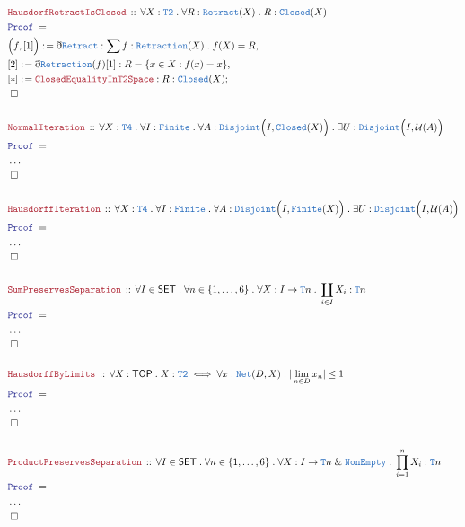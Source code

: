 \documentclass[12pt]{scrartcl}
\newcommand{\TYPE}[1]{\textcolor{NavyBlue}{\mathtt{#1}}}
\newcommand{\LOGIC}[1]{\textcolor{Blue}{\mathtt{#1}}}
\newcommand{\THM}[1]{\textcolor{Maroon}{\mathtt{#1}}}
\renewcommand{\.}{\; . \;}
\newcommand{\de}{: \kern 0.1pc =}
\newcommand{\Theorem}[2]{& \THM{#1} \, :: \, #2 \\ & \Proof = \\ }
\newcommand{\Page}[1]{ \begin{align*} #1 \end{align*}   }
\newcommand{ \bd }{ \ByDef }
\newcommand{\NoProof}{ & \ldots \\ \EndProof}
\renewcommand{\And}{\; \& \;}
\newcommand{\Say}[3]{& #1 \de #2 : #3, \\}
\newcommand{\Conclude}[3]{& #1 \de #2 : #3; \\}
\newcommand{\QED}{\; \square}
\newcommand{\EndProof}{& \QED \\}
\newcommand{\ByDef}{\eth}
\newcommand{\Proof}{\LOGIC{Proof} \; }
\newcommand{\SET}{\mathsf{SET}}
\newcommand{\TOP}{\mathsf{TOP}}
\newcommand{\U}{\mathcal{U}}
\begin{document}
\Page{ 
	\Theorem{HausdorfRetractIsClosed}
	{
		\forall X : \TYPE{T2} \.
		\forall R : \TYPE{Retract}(X)  \.
		R : \TYPE{Closed}(X)
	}
	\Say{\Big(f,[1]\Big)}{\bd \TYPE{Retract}}
	{
		\sum f : \TYPE{Retraction}(X) \. f(X) = R
	}
	\Say{[2]}{\bd \TYPE{Retraction}(f)[1]}{R = \{ x \in X : f(x) = x\}}
	\Conclude{[*]}{\THM{ClosedEqualityInT2Space}}
	{
		R : \TYPE{Closed}(X)
	}
	\EndProof
	\\
	\Theorem{NormalIteration}
	{
		\forall X : \TYPE{T4} \.
		\forall I : \TYPE{Finite} \.
		\forall A : \TYPE{Disjoint} \Big( I, \TYPE{Closed}(X) \Big) \.
		\exists U : \TYPE{Disjoint} \Big( I, \U(A) \Big) 
	}
	\NoProof
	\\
	\Theorem{HausdorffIteration}
	{
		\forall X : \TYPE{T4} \.
		\forall I : \TYPE{Finite} \.
		\forall A : \TYPE{Disjoint} \Big( I, \TYPE{Finite}(X) \Big) \.
		\exists U : \TYPE{Disjoint} \Big( I, \U(A) \Big) 
	}
	\NoProof
	\\
	\Theorem{SumPreservesSeparation}
	{
		\forall I \in \SET \.
		\forall n \in \{1,\ldots,6\} \.
		\forall X : I \to \TYPE{T}n \. 
		\coprod_{i \in I} X_i  : \TYPE{T}n
	}
	\NoProof
	\\
	\Theorem{HausdorffByLimits}
	{
		\forall X : \TOP \.
		X : \TYPE{T2} \iff \forall x : \TYPE{Net}(D,X) \. |\lim_{n \in D} x_n| \le 1
	}
	\NoProof
	\\
	\Theorem{ProductPreservesSeparation}
	{
		\forall I \in \SET \.
		\forall n \in \{1,\ldots, 6\} \.
		\forall X : I \to \TYPE{T}n \And \TYPE{NonEmpty} \. 
		\prod^n_{i=1} X_i : \TYPE{T}n
	}
	\NoProof
}
\end{document}
